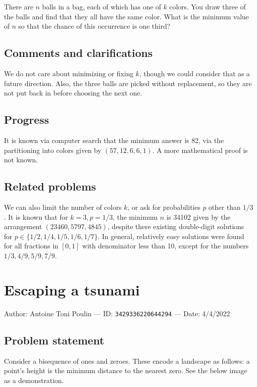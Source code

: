 \documentclass[10pt]{article}
\begin{document}
There are $n$ balls in a bag, each of which has one of $k$ colors. You draw three of the balls and find that they all have the same color. What is the minimum value of $n$ so that the chance of this occurrence is one third?

\subsection{Comments and clarifications}

We do not care about minimizing or fixing $k$, though we could consider that as a future direction. Also, the three balls are picked without replacement, so they are not put back in before choosing the next one.

\subsection{Progress}

It is known via computer search that the minimum answer is 82, via the partitioning into colors given by $(57,12,6,6,1)$. A more mathematical proof is not known.

\subsection{Related problems}

We can also limit the number of colors $k$, or ask for probabilities $p$ other than $1/3$. It is known that for $k=3,p=1/3$, the minimum $n$ is 34102 given by the arrangement $(23460, 5797, 4845)$, despite there existing double-digit solutions for $p\in\{1/2,1/4,1/5,1/6,1/7\}$. In general, relatively easy solutions were found for all fractions in $[0,1]$ with denominator less than 10, except for the numbers $1/3,4/9,5/9,7/9$.

\pagebreak

\section{Escaping a tsunami}

Author: Antoine Toni Poulin --- ID: \verb`3429336220644294` --- Date: 4/4/2022

\subsection{Problem statement}

Consider a bisequence of ones and zeroes. These encode a landscape as follows: a point's height is the minimum distance to the nearest zero. See the below image as a demonstration.
\end{document}
